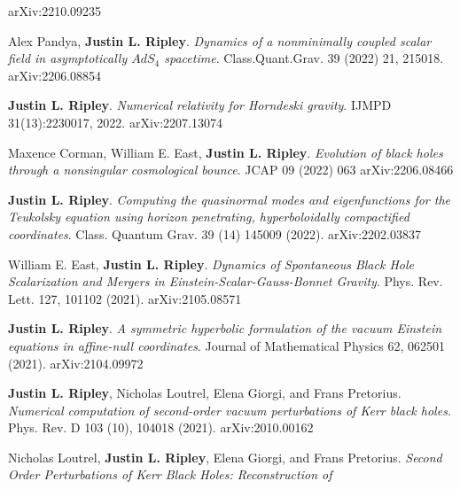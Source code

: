 \documentclass{my_cv}
\begin{document}
\begin{etaremune}
   arXiv:2210.09235
\item Alex Pandya, {\bf Justin L. Ripley}. 
   \emph{Dynamics of a nonminimally coupled scalar field in asymptotically
   $AdS_4$ spacetime}.
   Class.Quant.Grav. 39 (2022) 21, 215018.
   arXiv:2206.08854
\item {\bf Justin L. Ripley}. 
   \emph{Numerical relativity for Horndeski gravity}.
   IJMPD 31(13):2230017, 2022.
   arXiv:2207.13074 
\item Maxence Corman, William E. East, {\bf Justin L. Ripley}. 
   \emph{Evolution of black holes through a nonsingular cosmological bounce}.
   JCAP 09 (2022) 063
   arXiv:2206.08466
\item {\bf Justin L. Ripley}. 
   \emph{Computing the quasinormal modes and eigenfunctions for the 
   Teukolsky equation using horizon penetrating, 
   hyperboloidally compactified coordinates}.
   Class. Quantum Grav. 39 (14) 145009 (2022).
   arXiv:2202.03837
\item William E. East, {\bf Justin L. Ripley}. 
   \emph{Dynamics of Spontaneous Black Hole Scalarization and Mergers
   in Einstein-Scalar-Gauss-Bonnet Gravity}.
   Phys. Rev. Lett. 127, 101102 (2021).
   arXiv:2105.08571
\item {\bf Justin L. Ripley}. 
   \emph{A symmetric hyperbolic formulation of the vacuum
      Einstein equations in affine-null coordinates}.
   Journal of Mathematical Physics 62, 062501 (2021).
   arXiv:2104.09972
\item {\bf Justin L. Ripley}, 
   Nicholas Loutrel, Elena Giorgi, and Frans Pretorius. 
   \emph{Numerical computation of second-order vacuum perturbations of
      Kerr black holes}.
   Phys. Rev. D 103 (10), 104018 (2021). 
   arXiv:2010.00162
\item Nicholas Loutrel, {\bf Justin L. Ripley}, 
   Elena Giorgi, and Frans Pretorius. 
   \emph{Second Order Perturbations of Kerr Black Holes: Reconstruction of
}
\end{etaremune}
\end{document}
